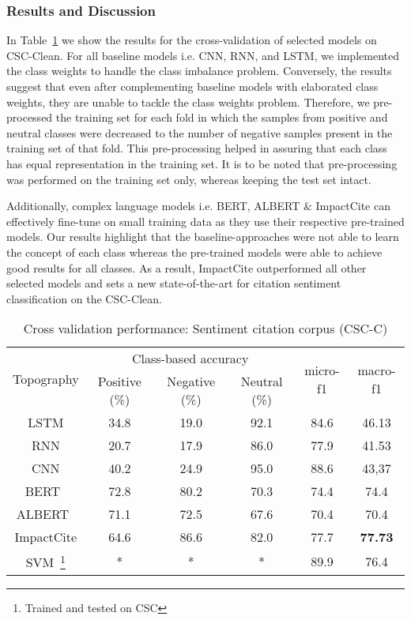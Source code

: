 \documentclass[runningheads]{llncs}
\begin{document}
\subsubsection{Results and Discussion}
In Table~\ref{tab:sentiment_scc_cross} we show the results for the cross-validation of selected models on CSC-Clean. For all baseline models i.e. CNN, RNN, and LSTM, we implemented the class weights to handle the class imbalance problem. Conversely, the results suggest that even after complementing baseline models with elaborated class weights, they are unable to tackle the class weights problem. Therefore, we pre-processed the training set for each fold in which the samples from positive and neutral classes were decreased to the number of negative samples present in the training set of that fold. This pre-processing helped in assuring that each class has equal representation in the training set. It is to be noted that pre-processing was performed on the training set only, whereas keeping the test set intact. 

Additionally, complex language models i.e. BERT, ALBERT \& ImpactCite can effectively fine-tune on small training data as they use their respective pre-trained models. Our results highlight that the baseline-approaches were not able to learn the concept of each class whereas the pre-trained models were able to achieve good results for all classes. As a result, ImpactCite outperformed all other selected models and sets a new state-of-the-art for citation sentiment classification on the CSC-Clean.

\begin{table}[!t]
\renewcommand{\arraystretch}{1.3}
\caption{Cross validation performance: Sentiment citation corpus (CSC-C)}
\label{tab:sentiment_scc_cross}
\centering
\begin{tabular}{|c|c|c|c||c|c|}
\hline
\multirow{2}{*}{Topography} & \multicolumn{3}{c||}{Class-based accuracy} & \multirow{2}{*}{micro-f1} & \multirow{2}{*}{macro-f1}\\
\cline{2-4}
& Positive (\%) & Negative (\%) & Neutral (\%) & &  \\
\hline
LSTM & 34.8 & 19.0 & 92.1 & 84.6 & 46.13 \\
\hline
RNN & 20.7 & 17.9 & 86.0 & 77.9 & 41.53 \\
\hline
CNN & 40.2 & 24.9 & 95.0 & 88.6 & 43,37 \\
\hline
\hline
BERT~\cite{devlin2018bert} & 72.8 & 80.2 & 70.3 & 74.4 & 74.4 \\
\hline
ALBERT~\cite{lan2019albert} & 71.1 & 72.5 & 67.6 & 70.4 & 70.4 \\
\hline
ImpactCite & 64.6 & 86.6 & 82.0 & 77.7 & \textbf{77.73} \\
\hline
\hline
SVM~\cite{athar:2011:SS}\footnote{Trained and tested on CSC} & * & * & * & 89.9 & 76.4 \\
\hline
\end{tabular}
\end{table}
\end{document}
